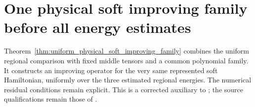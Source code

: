\section{One physical soft improving family before all energy estimates}
\label{sec:uniform_physical_soft_improving_family}

Theorem~\ref{thm:uniform_physical_soft_improving_family} combines the
uniform regional comparison with fixed middle tensors and a common
polynomial family. It constructs an improving operator for the very
same represented soft Hamiltonian, uniformly over the three estimated
regional energies. The numerical residual conditions remain explicit.
This is a corrected auxiliary to
\cite[Proposition~5.7 and Theorem~5.8]{Arad2016RigorousRG}; the source
qualifications remain those of
\cite{gap:alvv16_soft_regional_residuals,gap:alvv16_cluster_approximation}.

